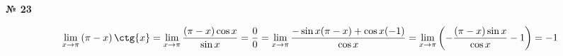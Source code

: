 \documentclass{article}
\begin{document}
\textbf{№ 23} 

$$ \lim\limits_{x\to \pi} \left( \pi-x\right) \ctg{x}
= \lim\limits_{x\to \pi} \frac{(\pi-x)\cos{x}}{\sin{x}}
= \frac{0}{0}
= \lim\limits_{x\to \pi} \frac{-\sin{x}(\pi-x)+\cos{x}(-1)}{\cos{x}} 
= \lim\limits_{x\to \pi} \left( -\frac{(\pi-x)\sin{x}}{\cos{x}} - 1 \right)
= -1 $$
\end{document}
